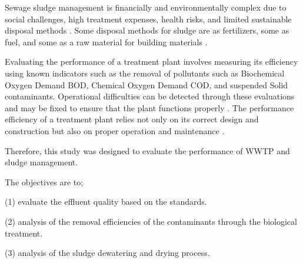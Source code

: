  Sewage sludge management is financially and environmentally complex due to social challenges, high treatment expenses, health risks, and limited sustainable disposal methods \cite{Fuerhacker2011}. Some disposal methods for sludge are as fertilizers, some as fuel, and some as a raw material for building materials \cite{Bratina2016}.
 
 Evaluating the performance of a treatment plant involves measuring its efficiency using known indicators such as the removal of pollutants such as Biochemical Oxygen Demand \ac{BOD}, Chemical Oxygen Demand \ac{COD}, and suspended Solid contaminants. Operational difficulties can be detected through these evaluations and may be fixed to ensure that the plant functions properly \cite{Khan2018}. The performance efficiency of a treatment plant relies not only on its correct design and construction but also on proper operation and maintenance \cite{Kumar2010}.

 
 Therefore, this study was designed to evaluate the performance of \ac{WWTP} and sludge management.


 The objectives are to; 
 
 (1) evaluate the effluent quality based on the standards. 
 
 (2) analysis of the removal efficiencies of the contaminants through the biological treatment.
 
 (3) analysis of the sludge dewatering and drying process.